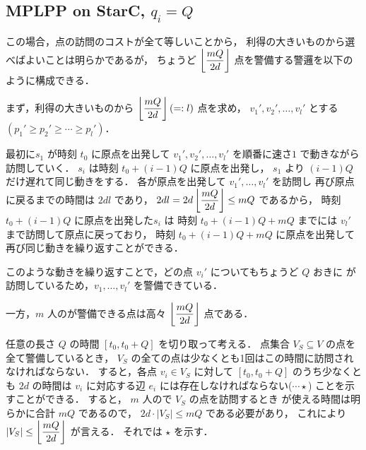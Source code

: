 \subsection{MPLPP on StarC, $q_i = Q$}
この場合，点の訪問のコストが全て等しいことから，
利得の大きいものから選べばよいことは明らかであるが，
ちょうど $\left\lfloor{\dfrac{mQ}{2d}}\right\rfloor$ 点を警備する警邏を以下のように構成できる．

まず，利得の大きいものから $\left\lfloor{\dfrac{mQ}{2d}}\right\rfloor (=: l)$ 点を求め，
$v_1', v_2', \ldots, v_l'$ とする 
$(p_1' \geq p_2' \geq \cdots \geq p_l')$．

最初に\server $s_1$ が時刻 $t_0$ に原点を出発して
$v_1', v_2', \ldots, v_l'$ を順番に速さ$1$ で動きながら訪問していく．
\server $s_i$ は時刻 $t_0 + (i - 1)Q$ に原点を出発し，
$s_1$ より $(i - 1)Q$ だけ遅れて同じ動きをする．
各\server が原点を出発して $v_1', \ldots, v_l'$ を訪問し
再び原点に戻るまでの時間は $2dl$ であり，
$2dl = 2d \left\lfloor{\dfrac{mQ}{2d}}\right\rfloor \leq mQ$ であるから，
時刻 $t_0 + (i - 1)Q$ に原点を出発した\server $s_i$ は
時刻 $t_0 + (i - 1)Q + mQ$ までには $v_l'$ まで訪問して原点に戻っており，
時刻 $t_0 + (i - 1)Q + mQ$ に原点を出発して再び同じ動きを繰り返すことができる．

このような動きを繰り返すことで，どの点 $v_i'$ についてもちょうど $Q$ おきに
\server が訪問しているため，$v_1, \ldots, v_l'$ を警備できている．


一方，$m$ 人の\server が警備できる点は高々 $\left\lfloor{\dfrac{mQ}{2d}}\right\rfloor$ 点である．

任意の長さ $Q$ の時間 $[t_0, t_0 + Q]$ を切り取って考える．
点集合 $V_S \subseteq V$ の点を全て警備しているとき，
$V_S$ の全ての点は少なくとも1回はこの時間に訪問されなければならない．
すると，各点 $v_i \in V_S$ に対して
$[t_0, t_0 + Q]$ のうち少なくとも $2d$ の時間は
$v_i$ に対応する辺 $e_i$ に\server は存在しなければならない($\cdots \star$)
ことを示すことができる．
すると， $m$ 人の\server で $V_S$ の点を訪問するとき
\server が使える時間は明らかに合計 $mQ$ であるので，
$2d \cdot |V_S| \leq mQ$ である必要があり，
これにより $|V_S| \leq \left\lfloor{\dfrac{mQ}{2d}}\right\rfloor$ が言える．
それでは $\star$ を示す．

